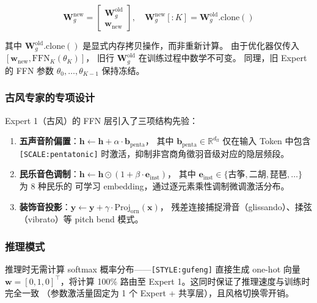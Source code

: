 \documentclass[UTF8,12pt,a4paper]{ctexart}
\begin{document}
\begin{equation}
\mathbf{W}_g^{\text{new}} = \begin{bmatrix}
\mathbf{W}_g^{\text{old}} \\ \hline
\mathbf{w}_{\text{new}}
\end{bmatrix},
\quad
\mathbf{W}_g^{\text{new}}[:K] = \mathbf{W}_g^{\text{old}}.\text{clone}()
\end{equation}

其中 $\mathbf{W}_g^{\text{old}}.\text{clone}()$ 是显式内存拷贝操作，而非重新计算。
由于优化器仅传入 $[\mathbf{w}_{\text{new}}, \text{FFN}_{K}(\theta_K)]$，
旧行 $\mathbf{W}_g^{\text{old}}$ 在训练过程中数学不可变。
同理，旧 Expert 的 FFN 参数 $\theta_0, \dots, \theta_{K-1}$ 保持冻结。

\subsubsection{古风专家的专项设计}

Expert 1（古风）的 FFN 层引入了三项结构先验：

\begin{enumerate}[leftmargin=2em]
\item \textbf{五声音阶偏置}：$\mathbf{h} \leftarrow \mathbf{h} + \alpha \cdot \mathbf{b}_{\text{penta}}$，
其中 $\mathbf{b}_{\text{penta}} \in \mathbb{R}^{d_{\text{ff}}}$ 仅在输入 Token 中包含
\texttt{[SCALE:pentatonic]} 时激活，抑制非宫商角徵羽音级对应的隐层频段。
\item \textbf{民乐音色调制}：$\mathbf{h} \leftarrow \mathbf{h} \odot (1 + \beta \cdot \mathbf{e}_{\text{inst}})$，
其中 $\mathbf{e}_{\text{inst}} \in \{\text{古筝}, \text{二胡}, \text{琵琶}, \dots\}$ 为 8 种民乐的
可学习 embedding，通过逐元素乘性调制微调激活分布。
\item \textbf{装饰音投影}：$\mathbf{y} \leftarrow \mathbf{y} + \gamma \cdot \text{Proj}_{\text{orn}}(\mathbf{x})$，
残差连接捕捉滑音（glissando）、揉弦（vibrato）等 pitch bend 模式。
\end{enumerate}

\subsubsection{推理模式}

推理时无需计算 softmax 概率分布——\texttt{[STYLE:gufeng]} 直接生成 one-hot 向量
$\mathbf{w} = [0, 1, 0]^\top$，将计算 100\% 路由至 Expert 1。这同时保证了推理速度与训练时完全一致
（参数激活量固定为 1 个 Expert + 共享层），且风格切换零开销。
\end{document}
